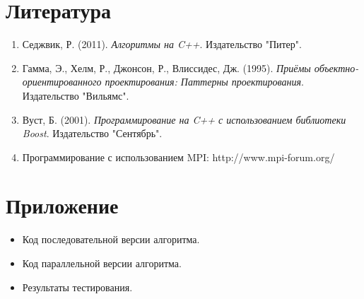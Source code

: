 \documentclass[a4paper,12pt]{article}
\begin{document}
\section*{Литература}
\begin{enumerate}
    \item Седжвик, Р. (2011). \textit{Алгоритмы на C++}. Издательство "Питер".
    \item Гамма, Э., Хелм, Р., Джонсон, Р., Влиссидес, Дж. (1995). \textit{Приёмы объектно-ориентированного проектирования: Паттерны проектирования}. Издательство "Вильямс".
    \item Вуст, Б. (2001). \textit{Программирование на C++ с использованием библиотеки Boost}. Издательство "Сентябрь".
    \item Программирование с использованием MPI: http://www.mpi-forum.org/
\end{enumerate}

\section*{Приложение}
\begin{itemize}
    \item Код последовательной версии алгоритма.
    \item Код параллельной версии алгоритма.
    \item Результаты тестирования.
\end{itemize}
\end{document}
